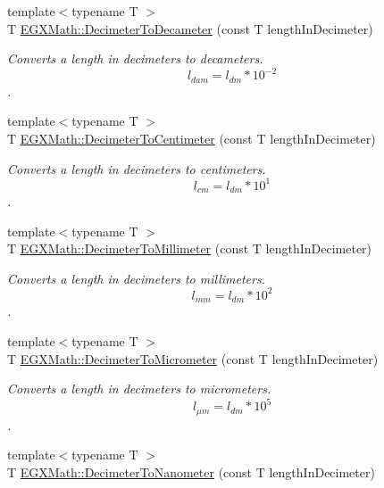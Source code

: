 \begin{DoxyCompactItemize}
{\footnotesize template$<$typename T $>$ }\\T \mbox{\hyperlink{group___e_g_x_math-_conversions-_length_conversions-_s_i-_decimeter-_s_i_ga20742de42223dbcd8af88e4e9feccfa4}{E\+G\+X\+Math\+::\+Decimeter\+To\+Decameter}} (const T length\+In\+Decimeter)
\begin{DoxyCompactList}\small\item\em Converts a length in decimeters to decameters. \[ l_{dam}=l_{dm} * 10^{-2} \]. \end{DoxyCompactList}\item 
{\footnotesize template$<$typename T $>$ }\\T \mbox{\hyperlink{group___e_g_x_math-_conversions-_length_conversions-_s_i-_decimeter-_s_i_ga032e40ec973eb890908799b87ba41710}{E\+G\+X\+Math\+::\+Decimeter\+To\+Centimeter}} (const T length\+In\+Decimeter)
\begin{DoxyCompactList}\small\item\em Converts a length in decimeters to centimeters. \[ l_{cm}=l_{dm} * 10^{1} \]. \end{DoxyCompactList}\item 
{\footnotesize template$<$typename T $>$ }\\T \mbox{\hyperlink{group___e_g_x_math-_conversions-_length_conversions-_s_i-_decimeter-_s_i_gad899e8bf5ade8cdc82e00b0fc81c2ee5}{E\+G\+X\+Math\+::\+Decimeter\+To\+Millimeter}} (const T length\+In\+Decimeter)
\begin{DoxyCompactList}\small\item\em Converts a length in decimeters to millimeters. \[ l_{mm}=l_{dm} * 10^{2} \]. \end{DoxyCompactList}\item 
{\footnotesize template$<$typename T $>$ }\\T \mbox{\hyperlink{group___e_g_x_math-_conversions-_length_conversions-_s_i-_decimeter-_s_i_ga5cf28083fa005b5a6a0dd6817c1633b7}{E\+G\+X\+Math\+::\+Decimeter\+To\+Micrometer}} (const T length\+In\+Decimeter)
\begin{DoxyCompactList}\small\item\em Converts a length in decimeters to micrometers. \[ l_{\mu m}=l_{dm} * 10^{5} \]. \end{DoxyCompactList}\item 
{\footnotesize template$<$typename T $>$ }\\T \mbox{\hyperlink{group___e_g_x_math-_conversions-_length_conversions-_s_i-_decimeter-_s_i_ga5bf2905937fea582ee35031d9017807f}{E\+G\+X\+Math\+::\+Decimeter\+To\+Nanometer}} (const T length\+In\+Decimeter)

\end{DoxyCompactItemize}
